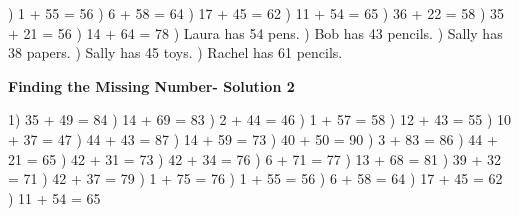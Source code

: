 \documentclass{article}%
\begin{document}
) 1 + 55 = 56%
) 6 + 58 = 64%
) 17 + 45 = 62%
) 11 + 54 = 65%
) 36 + 22 = 58%
) 35 + 21 = 56%
) 14 + 64 = 78%
) Laura has 54 pens.%
) Bob has 43 pencils.%
) Sally has 38 papers.%
) Sally has 45 toys.%
) Rachel has 61 pencils.%
\newline%
\newpage%
\large%
\begin{center}%
\textbf{Finding the Missing Number- Solution 2}%
\newline%
\end{center} \normalsize%
1) 35 + 49 = 84%
) 14 + 69 = 83%
) 2 + 44 = 46%
) 1 + 57 = 58%
) 12 + 43 = 55%
) 10 + 37 = 47%
) 44 + 43 = 87%
) 14 + 59 = 73%
) 40 + 50 = 90%
) 3 + 83 = 86%
) 44 + 21 = 65%
) 42 + 31 = 73%
) 42 + 34 = 76%
) 6 + 71 = 77%
) 13 + 68 = 81%
) 39 + 32 = 71%
) 42 + 37 = 79%
) 1 + 75 = 76%
) 1 + 55 = 56%
) 6 + 58 = 64%
) 17 + 45 = 62%
) 11 + 54 = 65%
\newline%
\end{document}
